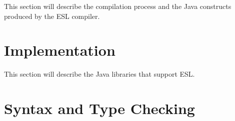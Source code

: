 \documentclass[5p,times]{elsarticle}
\begin{document}
This section will describe the compilation process and the Java constructs produced by the ESL compiler.

\section{Implementation}

\label{sec:implementation}

This section will describe the Java libraries that support ESL.



\clearpage

\appendix

\renewcommand*{\thesection}{\Alph{section}}

\section{Syntax and Type Checking}

\label{sec:syntax}
\end{document}
